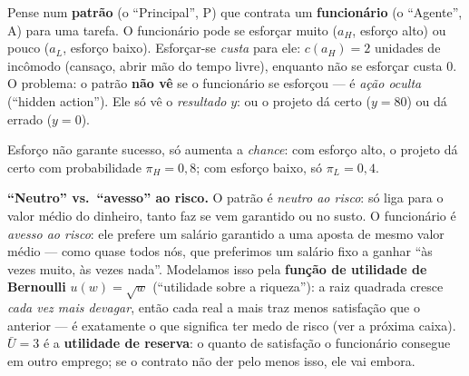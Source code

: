 \documentclass[11pt,a4paper]{article}
\newcommand{\dc}[2]{#1{,}#2}
\begin{document}
\begin{empalavras}
Pense num \textbf{patrão} (o ``Principal'', P) que contrata um \textbf{funcionário} (o
``Agente'', A) para uma tarefa. O funcionário pode se esforçar muito ($a_H$, esforço alto)
ou pouco ($a_L$, esforço baixo). Esforçar-se \emph{custa} para ele: $c(a_H) = 2$ unidades de
incômodo (cansaço, abrir mão do tempo livre), enquanto não se esforçar custa $0$. O problema:
o patrão \textbf{não vê} se o funcionário se esforçou — é \emph{ação oculta} (``hidden
action''). Ele só vê o \emph{resultado} $y$: ou o projeto dá certo ($y = 80$) ou dá errado
($y = 0$).

\smallskip\noindent
Esforço não garante sucesso, só aumenta a \emph{chance}: com esforço alto, o projeto dá
certo com probabilidade $\pi_H = \dc{0}{8}$; com esforço baixo, só $\pi_L = \dc{0}{4}$.

\smallskip\noindent
\textbf{``Neutro'' vs.\ ``avesso'' ao risco.} O patrão é \emph{neutro ao risco}: só liga
para o valor médio do dinheiro, tanto faz se vem garantido ou no susto. O funcionário é
\emph{avesso ao risco}: ele prefere um salário garantido a uma aposta de mesmo valor
médio — como quase todos nós, que preferimos um salário fixo a ganhar ``às vezes muito, às
vezes nada''. Modelamos isso pela \textbf{função de utilidade de Bernoulli} $u(w) = \sqrt{w}$
(``utilidade sobre a riqueza''): a raiz quadrada cresce \emph{cada vez mais devagar}, então
cada real a mais traz menos satisfação que o anterior — é exatamente o que significa ter
medo de risco (ver a próxima caixa). $\bar U = 3$ é a \textbf{utilidade de reserva}: o
quanto de satisfação o funcionário consegue em outro emprego; se o contrato não der pelo
menos isso, ele vai embora.
\end{empalavras}
\end{document}
